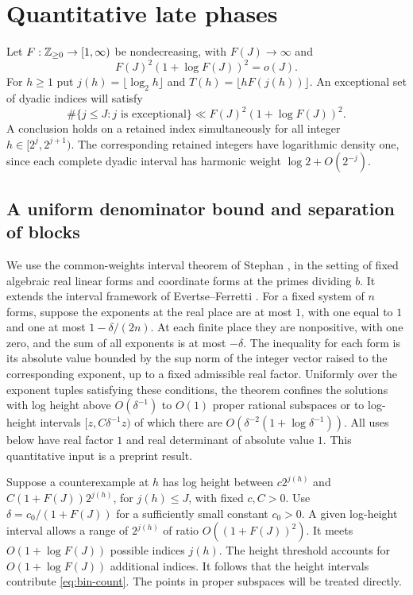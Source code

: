 \section{Quantitative late phases}\label{sec:late-phases}

Let \(F:\mathbb Z_{\ge0}\to[1,\infty)\) be nondecreasing, with
\(F(J)\to\infty\) and
\[
 F(J)^2(1+\log F(J))^2=o(J).
\]
For \(h\ge1\) put \(j(h)=\lfloor\log_2h\rfloor\) and
\(T(h)=\lfloor h F(j(h))\rfloor\). An exceptional set of dyadic
indices will satisfy
\begin{equation}\label{eq:bin-count}
 \#\{j\le J:j\text{ is exceptional}\}
       \ll F(J)^2(1+\log F(J))^2 .
\end{equation}
A conclusion holds on a retained index simultaneously for all integer
\(h\in[2^j,2^{j+1})\). The corresponding retained integers have
logarithmic density one, since each complete dyadic interval has
harmonic weight \(\log 2+O(2^{-j})\).

\subsection{A uniform denominator bound and separation of blocks}

We use the common-weights interval theorem of Stephan
\cite[Theorem~4.2]{Stephan}, in the setting of fixed algebraic real
linear forms and coordinate forms at the primes dividing \(b\).
It extends the interval framework of Evertse--Ferretti
\cite{EF}. For a fixed system of \(n\) forms, suppose the exponents at the real
place are at most \(1\), with one equal to \(1\) and one at most
\(1-\delta/(2n)\). At each finite place they are nonpositive, with
one zero, and the sum of all exponents is at most \(-\delta\).
The inequality for each form is its absolute value bounded by the
sup norm of the integer vector raised to the corresponding exponent,
up to a fixed admissible real factor. Uniformly over the exponent
tuples satisfying these conditions, the theorem confines the
solutions with log height above \(O(\delta^{-1})\) to
\(O(1)\) proper rational subspaces or to log-height intervals
\([z,C\delta^{-1}z)\) of which there are
\(O(\delta^{-2}(1+\log\delta^{-1}))\).
All uses below have real factor \(1\) and real determinant of
absolute value \(1\). This quantitative input is a preprint result.

Suppose a counterexample at \(h\) has log height between
\(c2^{j(h)}\) and \(C(1+F(J))2^{j(h)}\), for \(j(h)\le J\),
with fixed \(c,C>0\). Use \(\delta=c_0/(1+F(J))\) for a
sufficiently small constant \(c_0>0\). A given log-height interval
allows a range of \(2^{j(h)}\) of ratio \(O((1+F(J))^2)\).
It meets \(O(1+\log F(J))\) possible indices \(j(h)\).
The height threshold accounts for \(O(1+\log F(J))\)
additional indices. It follows that the height intervals
contribute \eqref{eq:bin-count}. The points in proper subspaces
will be treated directly.


